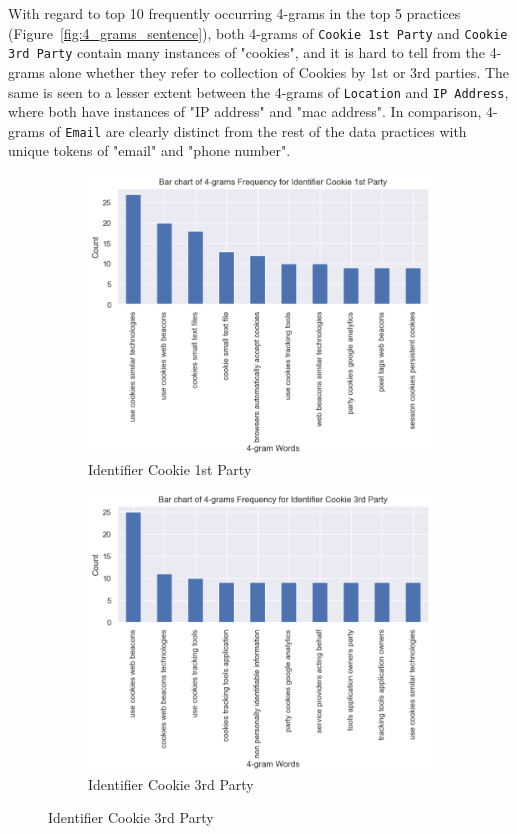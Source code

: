 With regard to top 10 frequently occurring 4-grams in the top 5 practices (Figure~\ref{fig:4_grams_sentence}), both 4-grams of \texttt{Cookie 1st Party} and \texttt{Cookie 3rd Party} contain many instances of "cookies", and it is hard to tell from the 4-grams alone whether they refer to collection of Cookies by 1st or 3rd parties. The same is seen to a lesser extent between the 4-grams of \texttt{Location} and \texttt{IP Address}, where both have instances of "IP address" and "mac address". In comparison, 4-grams of \texttt{Email} are clearly distinct from the rest of the data practices with unique tokens of "email" and "phone number".


\begin{figure}[!ht]
	\begin{subfigure}[t]{.5\textwidth}
	  \centering
	  \includegraphics[width=\linewidth]{figures/4_grams_cookie_1stParty.png}
	  \caption{Identifier Cookie 1st Party}
	\end{subfigure}
	\hfill
	\begin{subfigure}[t]{.5\textwidth}
	  \centering
	  \includegraphics[width=\linewidth]{figures/4_grams_cookie_3rdParty.png}
	  \caption{Identifier Cookie 3rd Party}
	\end{subfigure}
	

\end{figure}
